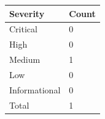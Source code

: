 \documentclass{article}
\begin{document}
                \begin{minipage}{.40\textwidth}
                \renewcommand{\arraystretch}{1.63}
                \begin{tabular}{|p{11em}|>{\centering\arraybackslash}p{6em}|}
                \hline
                \normalsize \cellcolor{black!10} \textbf{Severity} & \normalsize \cellcolor{black!10} \rule{0pt}{5ex} \textbf{Count} \\
                 \hline
                 \normalsize Critical &   \normalsize \cellcolor{critical} 0  \\
                 \hline
                 \normalsize High & \normalsize \cellcolor{high}  0 \\
                 \hline
                 \normalsize Medium & \normalsize \cellcolor{medium}  1 \\
                 \hline
                 \normalsize Low & \normalsize \cellcolor{low}  0 \\
                 \hline
                 \normalsize Informational & \normalsize \cellcolor{info} 0 \\
                 \hline
                 \normalsize Total & \normalsize \cellcolor{total} \rule{0pt}{5ex} 1 \\
                 \hline    
                \end{tabular}
                \end{minipage}

 

            \newpage
\end{document}
